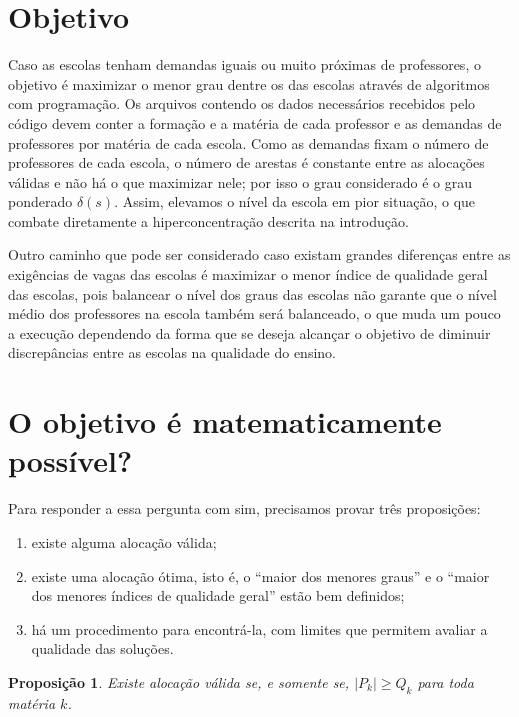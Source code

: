 \documentclass[12pt,a4paper]{article}
\newtheorem{proposicao}{Proposição}
\begin{document}
\section{Objetivo}

Caso as escolas tenham demandas iguais ou muito próximas de professores, o objetivo é maximizar o menor grau dentre os das escolas através de algoritmos com programação. Os arquivos contendo os dados necessários recebidos pelo código devem conter a formação e a matéria de cada professor e as demandas de professores por matéria de cada escola. Como as demandas fixam o número de professores de cada escola, o número de arestas é constante entre as alocações válidas e não há o que maximizar nele; por isso o grau considerado é o grau ponderado $\delta(s)$. Assim, elevamos o nível da escola em pior situação, o que combate diretamente a hiperconcentração descrita na introdução.

Outro caminho que pode ser considerado caso existam grandes diferenças entre as exigências de vagas das escolas é maximizar o menor índice de qualidade geral das escolas, pois balancear o nível dos graus das escolas não garante que o nível médio dos professores na escola também será balanceado, o que muda um pouco a execução dependendo da forma que se deseja alcançar o objetivo de diminuir discrepâncias entre as escolas na qualidade do ensino.


\section{O objetivo é matematicamente possível?}

Para responder a essa pergunta com sim, precisamos provar três proposições:

\begin{enumerate}
  \item[(1)] existe alguma alocação válida;
  \item[(2)] existe uma alocação ótima, isto é, o ``maior dos menores graus'' e o ``maior dos menores índices de qualidade geral'' estão bem definidos;
  \item[(3)] há um procedimento para encontrá-la, com limites que permitem avaliar a qualidade das soluções.
\end{enumerate}

\medskip

\begin{proposicao}\label{prop:1}
Existe alocação válida se, e somente se, $|P_k| \ge Q_k$ para toda matéria $k$.
\end{proposicao}
\end{document}
